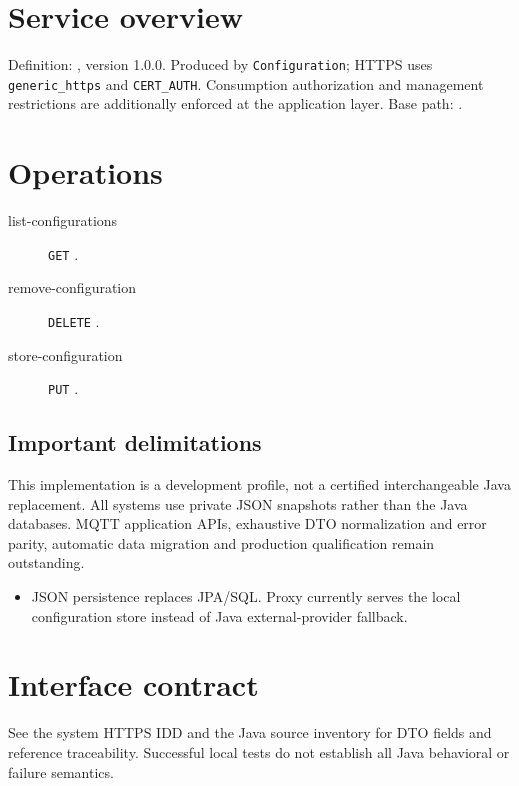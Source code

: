 \documentclass[a4paper]{arrowhead}
\begin{document}
\ArrowheadSetup
\section{Service overview}
Definition: , version 1.0.0. Produced by \texttt{Configuration}; HTTPS uses \texttt{generic\_https} and \texttt{CERT\_AUTH}. Consumption authorization and management restrictions are additionally enforced at the application layer. Base path: .
\section{Operations}
\begin{description}
\item[list-configurations] \texttt{GET} .
\item[remove-configuration] \texttt{DELETE} .
\item[store-configuration] \texttt{PUT} .
\end{description}
\subsection{Important delimitations}
This implementation is a development profile, not a certified interchangeable Java replacement. All systems use private JSON snapshots rather than the Java databases. MQTT application APIs, exhaustive DTO normalization and error parity, automatic data migration and production qualification remain outstanding.
\begin{itemize}
\item JSON persistence replaces JPA/SQL. Proxy currently serves the local configuration store instead of Java external-provider fallback.
\end{itemize}
\section{Interface contract}
See the system HTTPS IDD and the Java source inventory for DTO fields and reference traceability. Successful local tests do not establish all Java behavioral or failure semantics.
\end{document}
